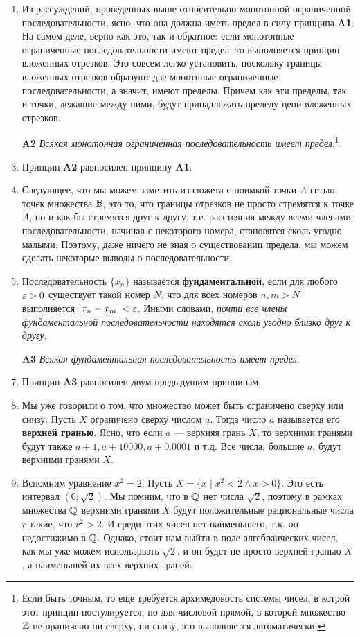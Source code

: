 \begin{enumerate}
\item Из рассуждений, проведенных выше относительно монотонной ограниченной последовательности, ясно, что она должна иметь предел в силу принципа \textbf{A1}. На самом деле, верно как это, так и обратное: если монотонные ограниченные последовательности имеют предел, то выполняется принцип вложенных отрезков. Это совсем легко установить, поскольку границы вложенных отрезков образуют две монотнные ограниченные последовательности, а значит, имеют пределы. Причем как эти пределы, так и точки, лежащие между ними, будут принадлежать пределу цепи вложенных отрезков.
\item[\bf A2] \textit{Всякая монотонная ограниченная последовательность имеет предел}.\footnote{Если быть точным, то еще требуется архимедовость системы чисел, в котрой этот принцип постулируется, но для числовой прямой, в которой множество $\mathbb Z$ не ораничено ни сверху, ни снизу, это выполняется автоматически.}
\item Принцип \textbf{A2} равносилен принципу \textbf{A1}.
\item Следующее, что мы можем заметить из сюжета с поимкой точки $A$ сетью точек множества $\mathbb B$, это то, что границы отрезков не просто стремятся к точке $A$, но и как бы стремятся друг к другу, т.е. расстояния между всеми членами последовательности, начиная с некоторого номера, становятся сколь угодно малыми. Поэтому, даже ничего не зная о существовании предела, мы можем сделать некоторые выводы о последовательности.
\item Последовательность $\{x_n\}$ называется \textbf{фундаментальной}, если для любого $\varepsilon>0$ существует такой номер $N$, что для всех номеров $n,m>N$ выполняется $|x_n-x_m|<\varepsilon$. Иными словами, \textit{почти все члены фундаментальной последовательности находятся сколь угодно близко друг к другу}.
\item[\bf A3] \textit{Всякая фундаментальная последовательность имеет предел}.
\item Принцип \textbf{A3} равносилен двум предыдущим принципам.
\item Мы уже говорили о том, что множество может быть ограничено сверху или снизу. Пусть $X$ ограничено сверху числом $a$. Тогда число $a$ называется его \textbf{верхней гранью}. Ясно, что если $a$ --- верхняя грань $X$, то верхними гранями будут также $a+1, a+10000, a+0.0001$  и т.д. Все числа, большие $a$, будут верхними гранями $X$.
\item Вспомним уравнение $x^2=2$. Пусть $X=\{x\mid x^2<2\land x>0\}$. Это есть интервал $(0;\sqrt 2)$. Мы помним, что в $\mathbb Q$ нет числа $\sqrt 2$, поэтому в рамках множества $\mathbb Q$ верхними гранями $X$ будут положительные рациональные числа $r$ такие, что $r^2>2$. И среди этих чисел нет наименьшего, т.к. он недостижимо в $\mathbb Q$. Однако, стоит нам выйти в поле алгебраических чисел, как мы уже можем использрвать $\sqrt 2$, и он будет не просто верхней гранью $X$, а наименьшей их всех верхних граней.

\end{enumerate}
